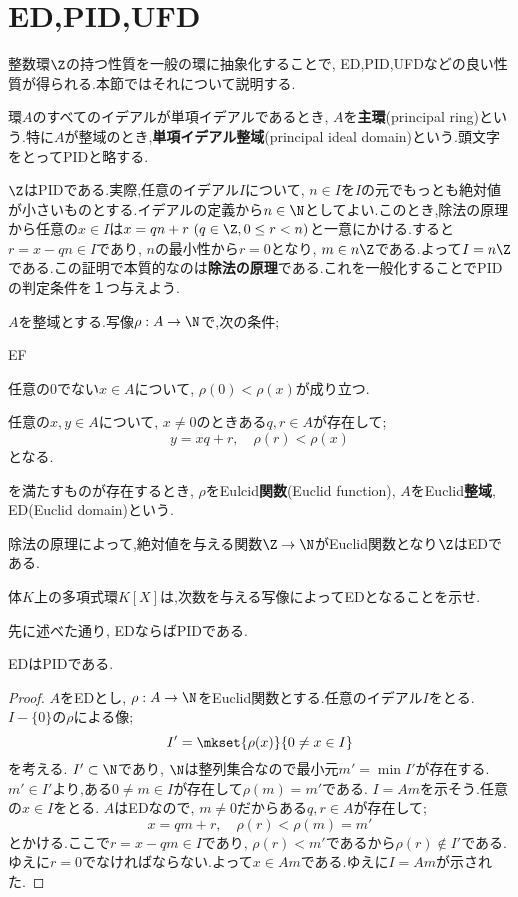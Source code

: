 \section{ED,PID,UFD}
整数環$\Z$の持つ性質を一般の環に抽象化することで, ED,PID,UFDなどの良い性質が得られる.本節ではそれについて説明する.

\begin{defi}[PID]
	環$A$のすべてのイデアルが単項イデアルであるとき, $A$を\textbf{主環}(principal ring)という.特に$A$が整域のとき,\textbf{単項イデアル整域}(principal ideal domain)という.頭文字をとってPIDと略する.
\end{defi}

$\Z$はPIDである.実際,任意のイデアル$I$について, $n\in I$を$I$の元でもっとも絶対値が小さいものとする.イデアルの定義から$n\in\N$としてよい.このとき,除法の原理から任意の$x\in I$は$x=qn+r~(q\in\Z,0\leq r<n)$と一意にかける.すると$r=x-qn\in I$であり, $n$の最小性から$r=0$となり, $m\in n\Z$である.よって$I=n\Z$である.この証明で本質的なのは\textbf{除法の原理}である.これを一般化することでPIDの判定条件を１つ与えよう.

\begin{defi}[Euclid整域]
	$A$を整域とする.写像$\rho:A\to\N$で,次の条件;
	\begin{defiterm}{EF}
		\item 任意の$0$でない$x\in A$について, $\rho(0)<\rho(x)$が成り立つ.
		\item 任意の$x,y\in A$について, $x\neq0$のときある$q,r\in A$が存在して;
		\[y=xq+r,\quad \rho(r)<\rho(x)\]
		となる.
	\end{defiterm}
	を満たすものが存在するとき, $\rho$をEulcid\textbf{関数}(Euclid function), $A$をEuclid\textbf{整域}, ED(Euclid domain)という.
\end{defi}

除法の原理によって,絶対値を与える関数$\Z\to\N$がEuclid関数となり$\Z$はEDである.
\begin{exer}
	体$K$上の多項式環$K[X]$は,次数を与える写像によってEDとなることを示せ.	
\end{exer}

先に述べた通り, EDならばPIDである.
\begin{thm}
	EDはPIDである.
\end{thm}
\begin{proof}
	$A$をEDとし, $\rho:A\to\N$をEuclid関数とする.任意のイデアル$I$をとる. $I-\{0\}$の$\rho$による像;
	\[I'=\mkset{\rho(x)}{0\neq x\in I}\]
	を考える. $I'\subset\N$であり, $\N$は整列集合なので最小元$m'=\min I'$が存在する. $m'\in I'$より,ある$0\neq m\in I$が存在して$\rho(m)=m'$である. $I=Am$を示そう.任意の$x\in I$をとる. $A$はEDなので, $m\neq0$だからある$q,r\in A$が存在して;
	\[x=qm+r,\quad \rho(r)<\rho(m)=m'\]
	とかける.ここで$r=x-qm\in I$であり, $\rho(r)<m'$であるから$\rho(r)\not\in I'$である.ゆえに$r=0$でなければならない.よって$x\in Am$である.ゆえに$I=Am$が示された.
\end{proof}

